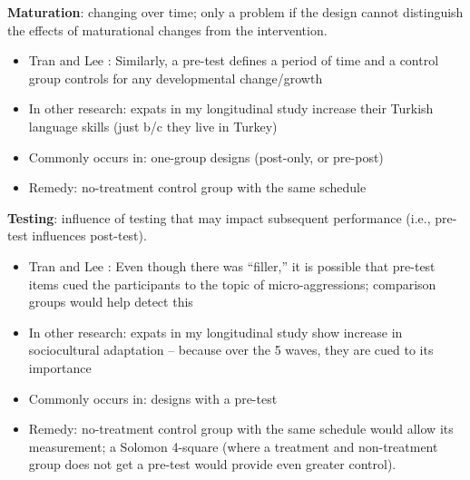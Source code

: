 \documentclass[
  english,
]{book}
\providecommand{\tightlist}{%
  \setlength{\itemsep}{0pt}\setlength{\parskip}{0pt}}
\begin{document}
\textbf{Maturation}: changing over time; only a problem if the design cannot distinguish the effects of maturational changes from the intervention.

\begin{itemize}
\tightlist
\item
  Tran and Lee \citeyearpar{tran_you_2014}: Similarly, a pre-test defines a period of time and a control group controls for any developmental change/growth
\item
  In other research: expats in my longitudinal study increase their Turkish language skills (just b/c they live in Turkey)
\item
  Commonly occurs in: one-group designs (post-only, or pre-post)
\item
  Remedy: no-treatment control group with the same schedule
\end{itemize}

\textbf{Testing}: influence of testing that may impact subsequent performance (i.e., pre-test influences post-test).

\begin{itemize}
\tightlist
\item
  Tran and Lee \citeyearpar{tran_you_2014}: Even though there was ``filler,'' it is possible that pre-test items cued the participants to the topic of micro-aggressions; comparison groups would help detect this
\item
  In other research: expats in my longitudinal study show increase in sociocultural adaptation -- because over the 5 waves, they are cued to its importance
\item
  Commonly occurs in: designs with a pre-test
\item
  Remedy: no-treatment control group with the same schedule would allow its measurement; a Solomon 4-square (where a treatment and non-treatment group does not get a pre-test would provide even greater control).
\end{itemize}
\end{document}
